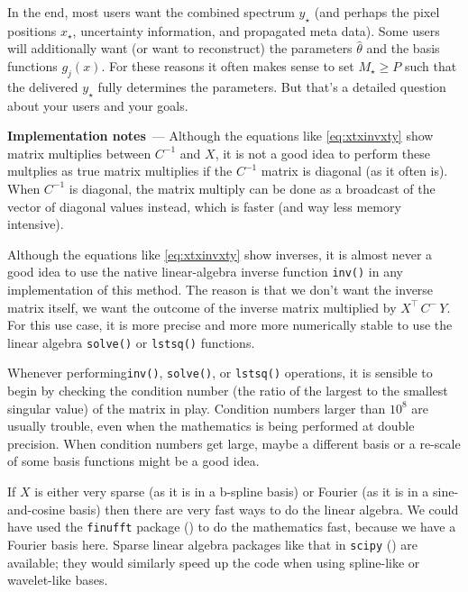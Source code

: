 \documentclass[modern]{aastex631}
\renewcommand{\paragraph}[1]{\medskip\par\noindent\textbf{#1}~---}
\begin{document}
In the end, most users want the combined spectrum $y_\star$ (and perhaps the pixel positions $x_\star$, uncertainty information, and propagated meta data).
Some users will additionally want (or want to reconstruct) the parameters $\hat\theta$ and the basis functions $g_j(x)$.
For these reasons it often makes sense to set $M_\star\geq P$ such that the delivered $y_\star$ fully determines the parameters.
But that's a detailed question about your users and your goals.

\paragraph{Implementation notes}
Although the equations like \eqref{eq:xtxinvxty} show matrix multiplies between $C^{-1}$ and $X$, it is not a good idea to perform these multplies as true matrix multiplies if the $C^{-1}$ matrix is diagonal (as it often is).
When $C^{-1}$ is diagonal, the matrix multiply can be done as a broadcast of the vector of diagonal values instead, which is faster (and way less memory intensive).

Although the equations like \eqref{eq:xtxinvxty} show inverses, it is almost never a good idea to use the native linear-algebra inverse function \texttt{inv()} in any implementation of this method.
The reason is that we don't want the inverse matrix itself, we want the outcome of the inverse matrix multiplied by $X^\top\,C^{-}\,Y$.
For this use case, it is more precise and more more numerically stable to use the linear algebra \texttt{solve()} or \texttt{lstsq()} functions.

Whenever performing\texttt{inv()}, \texttt{solve()}, or \texttt{lstsq()} operations, it is sensible to begin by checking the condition number (the ratio of the largest to the smallest singular value) of the matrix in play.
Condition numbers larger than $10^8$ are usually trouble, even when the mathematics is being performed at double precision.
When condition numbers get large, maybe a different basis or a re-scale of some basis functions might be a good idea.

If $X$ is either very sparse (as it is in a b-spline basis) or Fourier (as it is in a sine-and-cosine basis) then there are very fast ways to do the linear algebra.
We could have used the \texttt{finufft} package (\citealt{finufft}) to do the mathematics fast, because we have a Fourier basis here.
Sparse linear algebra packages like that in \texttt{scipy} (\citealt{scipy}) are available; they would similarly speed up the code when using spline-like or wavelet-like bases.
\end{document}

